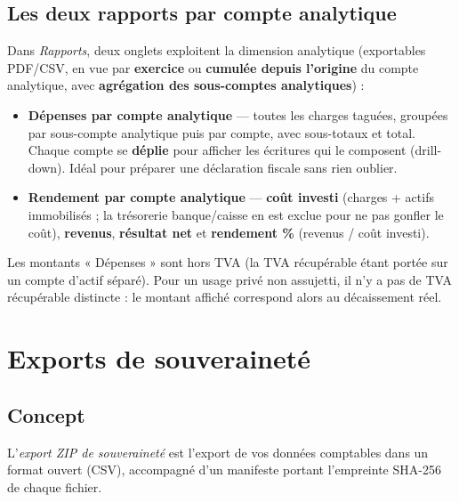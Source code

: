 \documentclass[a4paper,11pt,oneside]{article}
\begin{document}
\subsection{Les deux rapports par compte analytique}

Dans \emph{Rapports}, deux onglets exploitent la dimension analytique (exportables PDF/CSV,
en vue par \textbf{exercice} ou \textbf{cumulée depuis l'origine} du compte analytique, avec
\textbf{agrégation des sous-comptes analytiques}) :
\begin{itemize}
    \item \textbf{Dépenses par compte analytique} — toutes les charges taguées, groupées par
          sous-compte analytique puis par compte, avec sous-totaux et total. Chaque compte se
          \textbf{déplie} pour afficher les écritures qui le composent (drill-down).
          Idéal pour préparer une déclaration fiscale sans rien oublier.
    \item \textbf{Rendement par compte analytique} — \textbf{coût investi} (charges + actifs immobilisés
          ; la trésorerie banque/caisse en est exclue pour ne pas gonfler le coût),
          \textbf{revenus}, \textbf{résultat net} et \textbf{rendement \%}
          (revenus / coût investi).
\end{itemize}

\begin{keshtip}
Les montants « Dépenses » sont hors TVA (la TVA récupérable étant portée sur un compte
d'actif séparé). Pour un usage privé non assujetti, il n'y a pas de TVA récupérable
distincte : le montant affiché correspond alors au décaissement réel.
\end{keshtip}

\section{Exports de souveraineté}\label{sec:exports}

\subsection{Concept}

L'\emph{export ZIP de souveraineté} est l'export de vos données comptables dans un format
ouvert (CSV), accompagné d'un manifeste portant l'empreinte SHA-256 de chaque fichier.
\end{document}
